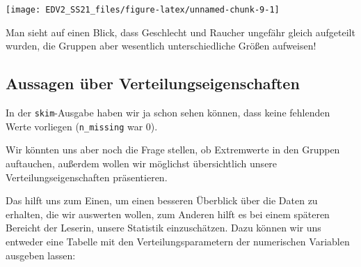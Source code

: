 \documentclass[
]{book}
\begin{document}
\begin{center}\texttt{[image: EDV2\_SS21\_files/figure-latex/unnamed-chunk-9-1]} \end{center}

Man sieht auf einen Blick, dass Geschlecht und Raucher ungefähr gleich aufgeteilt wurden, die Gruppen aber wesentlich unterschiedliche Größen aufweisen!

\hypertarget{aussagen-uxfcber-verteilungseigenschaften}{%
\subsection{Aussagen über Verteilungseigenschaften}\label{aussagen-uxfcber-verteilungseigenschaften}}

In der \texttt{skim}-Ausgabe haben wir ja schon sehen können, dass keine fehlenden Werte vorliegen (\texttt{n\_missing} war 0).

Wir könnten uns aber noch die Frage stellen, ob Extremwerte in den Gruppen auftauchen, außerdem wollen wir möglichst übersichtlich unsere Verteilungseigenschaften präsentieren.

Das hilft uns zum Einen, um einen besseren Überblick über die Daten zu erhalten, die wir auswerten wollen, zum Anderen hilft es bei einem späteren Bereicht der Leserin, unsere Statistik einzuschätzen.
Dazu können wir uns entweder eine Tabelle mit den Verteilungsparametern der numerischen Variablen ausgeben lassen:
\end{document}
